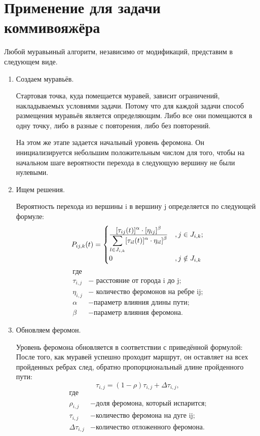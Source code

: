 \documentclass[a4paper,oneside,14pt]{extreport}
\begin{document}
\section{Применение для задачи коммивояжёра}
Любой муравьиный алгоритм, независимо от модификаций, представим в следующем виде.
\begin{enumerate}
	\item Создаем муравьёв.
	
	Стартовая точка, куда помещается муравей, зависит ограничений, накладываемых условиями задачи. Потому что для каждой задачи способ размещения муравьёв является определяющим. Либо все они помещаются в одну точку, либо в разные с повторения, либо без повторений. 
	
	На этом же этапе задается начальный уровень феромона. Он инициализируется небольшим положительным числом для того, чтобы на начальном шаге вероятности перехода в следующую вершину не были нулевыми. 
	
	\item Ищем решения.
	
	Вероятность перехода из вершины i в вершину j определяется по следующей формуле:\\ 
	\begin{equation}
	P_{i j, k} (t)= \begin{cases}
	\displaystyle[\tau_{ij}(t)]^\alpha \cdot [\eta_{ij}]^\beta\over 
	\displaystyle\sum\limits_{l \in J_{i, k }} [\tau_{il}(t)]^\alpha \cdot \eta_{il}]^\beta &, j \in J_{i, k};\\
	0 &, j \notin J_{i, k}
	\end{cases}
	\end{equation}
	\begin{align*}
	\text{где} \\
	\tau _{i,j} &- \text{ расстояние от города i до j;} \\
	\eta _{i,j} &- \text{ количество феромонов на ребре ij;} \\
	\alpha &- \text{параметр влияния длины пути;} \\
	\beta &- \text{параметр влияния феромона.}
	\end{align*}
	
	\item Обновляем феромон.
	
	Уровень феромона обновляется в соответствии с приведённой формулой:
	После того, как муравей успешно проходит маршрут, он оставляет на всех пройденных ребрах след, обратно пропорциональный длине пройденного пути:
	\begin{equation}\label{form:eva} 
	\tau _{i,j}=(1-\rho )\tau _{i,j}+\Delta \tau _{i,j},
	\end{equation}
	\begin{align*}
	\text{где} \\
	\rho _{i,j} &- \text{доля феромона, который испарится;} \\
	\tau _{i,j} &- \text{количество феромона на дуге ij;} \\
	\Delta \tau _{i,j} &- \text{количество отложенного феромона.}
	\end{align*}
	

\end{enumerate}
\end{document}
